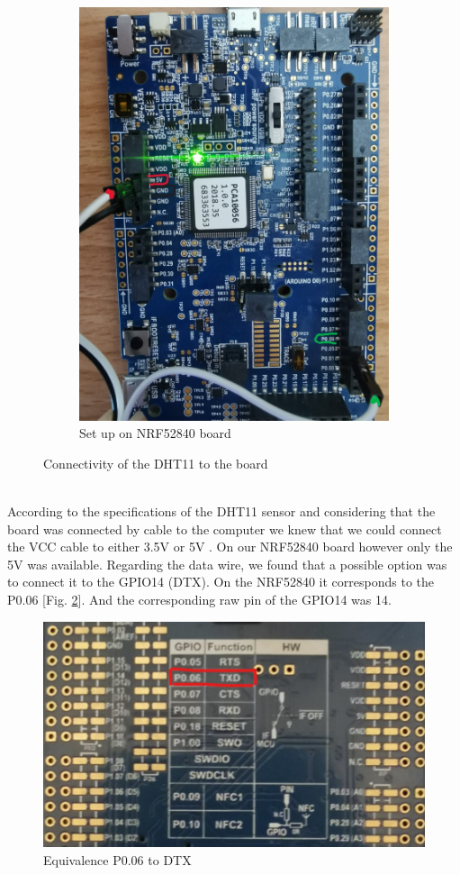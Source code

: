 \begin{figure}
\begin{subfigure}[b]{0.45\columnwidth}
        \includegraphics[width=\columnwidth]{images/ConnectivityToBoard.jpeg}
        \caption{Set up on NRF52840 board}
    \end{subfigure}
    \caption{Connectivity of the DHT11 to the board}
    \label{fig:connectionDHT11}
\end{figure}\\

According to the specifications of the DHT11 sensor and considering that the board was connected by cable to the computer we
knew that we could connect the VCC cable to either 3.5V or 5V \cite{b1}. On our NRF52840 board however only the 5V was available. 
Regarding the data wire, we found that a possible option was to connect it to the GPIO14 (DTX)\cite{b2}. On the NRF52840 it corresponds to the P0.06 [Fig. \ref{fig:DTX}]. And the corresponding raw pin of the GPIO14 was 14. 

\begin{figure}[!ht]%
    \centering
    \includegraphics[scale=0.2]{images/GPIO14Arduino.jpg}%
    \caption{Equivalence P0.06 to DTX}%
    \label{fig:DTX}%
\end{figure}
